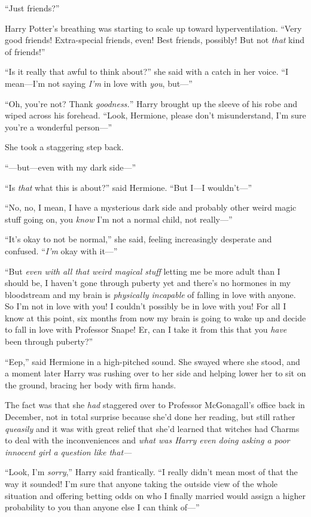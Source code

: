 “Just friends?”

Harry Potter’s breathing was starting to scale up toward hyperventilation. “Very good friends! Extra-special friends, even! Best friends, possibly! But not \emph{that} kind of friends!”

“Is it really that awful to think about?” she said with a catch in her voice. “I mean—I’m not saying \emph{I’m} in love with \emph{you}, but—”

“Oh, you’re not? Thank \emph{goodness.}” Harry brought up the sleeve of his robe and wiped across his forehead. “Look, Hermione, please don’t misunderstand, I’m sure you’re a wonderful person—”

She took a staggering step back.

“—but—even with my dark side—”

“Is \emph{that} what this is about?” said Hermione. “But I—I wouldn’t—”

“No, no, I mean, I have a mysterious dark side and probably other weird magic stuff going on, you \emph{know} I’m not a normal child, not really—”

“It’s okay to not be normal,” she said, feeling increasingly desperate and confused. “\emph{I’m} okay with it—”

“But \emph{even with all that weird magical stuff} letting me be more adult than I should be, I haven’t gone through puberty yet and there’s no hormones in my bloodstream and my brain is \emph{physically incapable} of falling in love with anyone. So I’m not in love with you! I couldn’t possibly be in love with you! For all I know at this point, six months from now my brain is going to wake up and decide to fall in love with Professor Snape! Er, can I take it from this that you \emph{have} been through puberty?”

“Eep,” said Hermione in a high-pitched sound. She swayed where she stood, and a moment later Harry was rushing over to her side and helping lower her to sit on the ground, bracing her body with firm hands.

The fact was that she \emph{had} staggered over to Professor McGonagall’s office back in December, not in total surprise because she’d done her reading, but still rather \emph{queasily} and it was with great relief that she’d learned that witches had Charms to deal with the inconveniences and \emph{what was Harry even doing asking a poor innocent girl a question like that—}

“Look, I’m \emph{sorry},” Harry said frantically. “I really didn’t mean most of that the way it sounded! I’m sure that anyone taking the outside view of the whole situation and offering betting odds on who I finally married would assign a higher probability to you than anyone else I can think of—”

